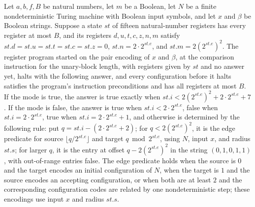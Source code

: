 \begin{theorem}
\label{Complexity.PathHard.walk_halt}
\leanok
{}
Let $a,b,f,B$ be natural numbers, let $m$ be a Boolean, let $N$ be a finite
nondeterministic Turing machine with Boolean input symbols, and let $x$ and $\beta$ be
Boolean strings. Suppose a state $st$ of fifteen natural-number registers has every
register at most $B$, and its registers $d,u,t,c,z,n,m$ satisfy
$st.d=st.u=st.t=st.c=st.z=0$, $st.n=2\cdot 2^{st.e}$, and $st.m=2(2^{st.e})^2$. The
register program started on the pair encoding of $x$ and $\beta$, at the comparison
instruction for the unary-block length, with registers given by $st$ and no answer yet,
halts with the following answer, and every configuration before it halts satisfies the
program’s instruction preconditions and has all registers at most $B$. If the mode is
true, the answer is true exactly when $st.i<2(2^{st.e})^2+2\cdot2^{st.e}+7$. If the mode
is false, the answer is true when $st.i<2\cdot2^{st.e}$, false when
$st.i=2\cdot2^{st.e}$, true when $st.i=2\cdot2^{st.e}+1$, and otherwise is determined by
the following rule: put $q=st.i-(2\cdot2^{st.e}+2)$; for $q<2(2^{st.e})^2$, it is the
edge predicate for source $\lfloor q/2^{st.e}\rfloor$ and target $q\bmod 2^{st.e}$,
using $N$, input $x$, and radius $st.s$; for larger $q$, it is the entry at offset
$q-2(2^{st.e})^2$ in the string $(0,1,0,1,1)$, with out-of-range entries false. The edge
predicate holds when the source is $0$ and the target encodes an initial configuration
of $N$, when the target is $1$ and the source encodes an accepting configuration, or
when both are at least $2$ and the corresponding configuration codes are related by one
nondeterministic step; these encodings use input $x$ and radius $st.s$.
\end{theorem}
